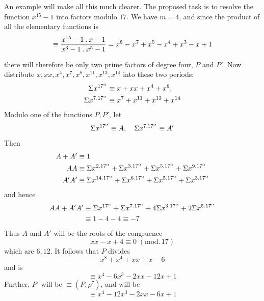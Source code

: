 An example will make all this much clearer. The proposed task is to resolve the function $x^{15}-1$ into factors modulo $17$. We have $m=4$, and since the product of all the elementary functions is
\[
\equiv\frac{x^{15}-1\mathbin{.} x-1}{x^3-1\mathbin{.} x^5-1}=x^8-x^7+x^5-x^4+x^3-x+1
\]

there will therefore be only two prime factors of degree four, $P$ and $P'$. Now distribute $x,xx,x^4,x^7,x^8,x^{11},x^{13},x^{14}$ into these two periods:
\[
\begin{aligned}
\Sigma x^{17^\alpha}&\equiv x+xx+x^4+x^8,\\
\Sigma x^{7\mathbin{.}17^\alpha}&\equiv x^7+x^{11}+x^{13}+x^{14}
\end{aligned}
\]
Modulo one of the functions $P,P'$, let
\[
\Sigma x^{17^\alpha}\equiv A,\quad\Sigma x^{7\mathbin{.}17^\alpha}\equiv A'
\]
Then
\[
\begin{aligned}
A+A'&\equiv1\\
AA&\equiv\Sigma x^{2\mathbin{.}17^\alpha}+\Sigma x^{3\mathbin{.}17^\alpha}+\Sigma x^{5\mathbin{.}17^\alpha}+\Sigma x^{9\mathbin{.}17^\alpha}\\
A'A'&\equiv\Sigma x^{14\mathbin{.}17^\alpha}+\Sigma x^{6\mathbin{.}17^\alpha}+\Sigma x^{5\mathbin{.}17^\alpha}+\Sigma x^{3\mathbin{.}17^\alpha}
\end{aligned}
\]
and hence
\[
\begin{aligned}
AA+A'A'&\equiv\Sigma x^{17^\alpha}+\Sigma x^{7\mathbin{.}17^\alpha}+4\Sigma x^{3\mathbin{.}17^\alpha}+2\Sigma x^{5\mathbin{.}17^\alpha}\\
&\equiv1-4-4\equiv-7
\end{aligned}
\]
Thus $A$ and $A'$ will be the roots of the congruence
\[
xx-x+4\equiv0\;(\mathrm{mod.}\,17)
\]
which are $6,12$. It follows that $P$ divides
\[
x^8+x^4+xx+x-6
\]
and is
\[
\equiv x^4-6x^3-2xx-12x+1
\]
Further, $P'$ will be $\equiv(P,\rho^7)$, and will be
\[
\equiv x^4-12x^3-2xx-6x+1
\]
